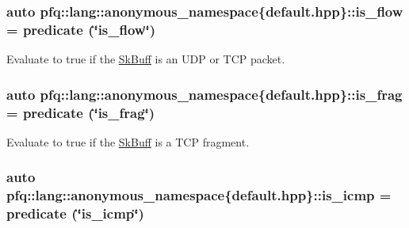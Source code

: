 \subsubsection[{\texorpdfstring{is\+\_\+flow}{is_flow}}]{\setlength{\rightskip}{0pt plus 5cm}auto pfq\+::lang\+::anonymous\+\_\+namespace\{default.\+hpp\}\+::is\+\_\+flow = {\bf predicate} (\char`\"{}is\+\_\+flow\char`\"{})}\hypertarget{namespacepfq_1_1lang_1_1anonymous__namespace_02default_8hpp_03_ae52890434121a999589d48bccae3c3e2}{}\label{namespacepfq_1_1lang_1_1anonymous__namespace_02default_8hpp_03_ae52890434121a999589d48bccae3c3e2}


Evaluate to {\ttfamily true} if the \hyperlink{structpfq_1_1lang_1_1SkBuff}{Sk\+Buff} is an U\+DP or T\+CP packet. 

\subsubsection[{\texorpdfstring{is\+\_\+frag}{is_frag}}]{\setlength{\rightskip}{0pt plus 5cm}auto pfq\+::lang\+::anonymous\+\_\+namespace\{default.\+hpp\}\+::is\+\_\+frag = {\bf predicate} (\char`\"{}is\+\_\+frag\char`\"{})}\hypertarget{namespacepfq_1_1lang_1_1anonymous__namespace_02default_8hpp_03_af042e092c925ae6306ae85ae5a56563d}{}\label{namespacepfq_1_1lang_1_1anonymous__namespace_02default_8hpp_03_af042e092c925ae6306ae85ae5a56563d}


Evaluate to {\ttfamily true} if the \hyperlink{structpfq_1_1lang_1_1SkBuff}{Sk\+Buff} is a T\+CP fragment. 

\subsubsection[{\texorpdfstring{is\+\_\+icmp}{is_icmp}}]{\setlength{\rightskip}{0pt plus 5cm}auto pfq\+::lang\+::anonymous\+\_\+namespace\{default.\+hpp\}\+::is\+\_\+icmp = {\bf predicate} (\char`\"{}is\+\_\+icmp\char`\"{})}\hypertarget{namespacepfq_1_1lang_1_1anonymous__namespace_02default_8hpp_03_a01ccba89c8582ba423393226b54f12de}{}\label{namespacepfq_1_1lang_1_1anonymous__namespace_02default_8hpp_03_a01ccba89c8582ba423393226b54f12de}



